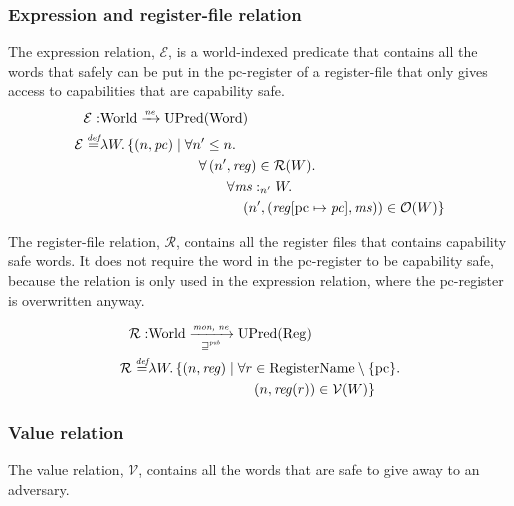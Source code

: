 \documentclass[compsoc,conference,letterpaper,fleqn]{IEEEtran}
\newcommand{\update}[2]{[#1 \mapsto #2]}
\newcommand{\nefun}{\xrightarrow{\textit{\tiny{ne}}}}
\newcommand{\defeq}{\stackrel{\textit{\tiny{def}}}{=}}
\newcommand{\var}[1]{\mathit{#1}}
\newcommand{\hs}{\var{ms}}
\newcommand{\pc}{\mathit{pc}}
\newcommand{\pcreg}{\mathrm{pc}}
\newcommand{\reg}{\var{reg}}
\newcommand{\heap}{\var{mem}}
\newcommand{\futurewk}{\mathbin{\sqsupseteq}^{\var{pub}}}
\newcommand{\heapSat}[3][\heap]{#1 :_{#2} #3}
\newcommand{\monwknefun}{\xrightarrow[\text{\tiny{$\futurewk$}}]{\textit{\tiny{mon, ne}}}}
\newcommand{\asmType}{\plaindom{AsmType}}
\newcommand{\plaindom}[1]{\mathrm{#1}}
\newcommand{\Words}{\plaindom{Word}}
\newcommand{\RegName}{\plaindom{RegisterName}}
\newcommand{\Regs}{\plaindom{Reg}}
\newcommand{\Worlds}{\plaindom{World}}
\newcommand{\UPred}[1]{\plaindom{UPred}(#1)}
\newcommand{\intr}[2]{\mathcal{#1}}
\newcommand{\valueintr}[1]{\intr{V}{#1}}
\newcommand{\exprintr}[1]{\intr{E}{#1}}
\newcommand{\regintr}[1]{\intr{R}{#1}}
\newcommand{\stdvr}{\valueintr{\asmType}}
\newcommand{\stder}{\exprintr{\asmType}}
\newcommand{\stdrr}{\regintr{\asmType}}
\newcommand{\observations}{\mathcal{O}}
\newcommand{\npair}[2][n]{\left(#1,#2 \right)}
\begin{document}
\subsubsection{Expression and register-file relation}
The expression relation, $\stder$, is a world-indexed predicate that
contains all the words that safely can be put in the $\pcreg$-register
of a register-file that only gives access to capabilities that are capability
safe. 
\begin{align*}
  \stder : & \Worlds \nefun \UPred{\Words} \\
  \stder \defeq & \lambda W \ldotp \{ \npair{\pc} \mid 
                  \begin{aligned}[t]
                    & \forall n' \leq n \ldotp\\
                    & \quad \forall \npair[n']{\reg} \in \stdrr(W) \ldotp \\
                    & \quad \qquad  \forall \heapSat[\hs]{n'}{W} \ldotp \\
                    & \quad \qquad \quad \npair[n']{(\reg\update{\pcreg}{\pc},\hs)} \in \observations(W) \}
                  \end{aligned}
\end{align*}

The register-file relation, $\stdrr$, contains all the register files
that contains capability safe words. It does not require the word in
the $\pcreg$-register to be capability safe, because the relation is
only used in the expression relation, where the $\pcreg$-register is
overwritten anyway.

\begin{align*}
  \stdrr : & \Worlds \monwknefun \UPred{\Regs} \\
  \stdrr \defeq & \lambda W \ldotp
                  \begin{aligned}[t]
                    \{ \npair{\reg} \mid & \;\forall r \in \RegName \setminus \{\pcreg\} \ldotp \\
                    & \;\quad  \npair{\reg(r)} \in \stdvr(W) \}
                  \end{aligned}
\end{align*}

\subsubsection{Value relation}
The value relation, $\stdvr$, contains all the words that are safe to
give away to an adversary.
\end{document}
